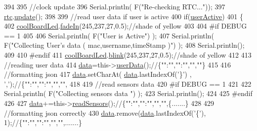 \begin{DoxyCode}
394 
395     \textcolor{comment}{//clock update}
396     Serial.println( F(\textcolor{stringliteral}{"Re-checking RTC..."}));
397     \hyperlink{class_cool_board_a50d2a6716879d64a85f3c6b44ad63275}{rtc}.\hyperlink{class_cool_time_aae601f795452cfa48d9fb337aed483a8}{update}();
398 
399     \textcolor{comment}{//read user data if user is active}
400     \textcolor{keywordflow}{if}(\hyperlink{class_cool_board_a6395459131d6889a3005f79c7a35e964}{userActive})
401     \{
402         \hyperlink{class_cool_board_a1b1d3c684a5baa56b08486e192fd8e97}{coolBoardLed}.\hyperlink{class_cool_board_led_ab778f5e7bed0ab74e3906d82110493c3}{fadeIn}(245,237,27,0.5);\textcolor{comment}{//shade of yellow}
403     
404 \textcolor{preprocessor}{    #if DEBUG == 1}
405 
406         Serial.println( F(\textcolor{stringliteral}{"User is Active"}) );
407         Serial.println( F(\textcolor{stringliteral}{"Collecting User's data ( mac,username,timeStamp )"}) );
408         Serial.println();
409     
410 \textcolor{preprocessor}{    #endif  }
411         \hyperlink{class_cool_board_a1b1d3c684a5baa56b08486e192fd8e97}{coolBoardLed}.\hyperlink{class_cool_board_led_a96e1ea13003eee34c9dbcef340404426}{blink}(245,237,27,0.5);\textcolor{comment}{//shade of yellow   }
412 
413         \textcolor{comment}{//reading user data}
414         \hyperlink{class_cool_board_a427fb753dd8575bdf821c70a5c63d695}{data}=this->\hyperlink{class_cool_board_ae7358fb6e623cfc81b775f5f1734909b}{userData}();\textcolor{comment}{//\{"":"","":"","",""\}}
415 
416         \textcolor{comment}{//formatting json }
417         \hyperlink{class_cool_board_a427fb753dd8575bdf821c70a5c63d695}{data}.setCharAt( \hyperlink{class_cool_board_a427fb753dd8575bdf821c70a5c63d695}{data}.lastIndexOf(\textcolor{charliteral}{'\}'}) , \textcolor{charliteral}{','});\textcolor{comment}{//\{"":"","":"","","",}
418                 
419         \textcolor{comment}{//read sensors data}
420 \textcolor{preprocessor}{    #if DEBUG == 1}
421 
422         Serial.println( F(\textcolor{stringliteral}{"Collecting sensors data "}) );
423         Serial.println();
424     
425 \textcolor{preprocessor}{    #endif}
426 
427         \hyperlink{class_cool_board_a427fb753dd8575bdf821c70a5c63d695}{data}+=this->\hyperlink{class_cool_board_ad03abdce2e65f520bbf2cff0f2d083cf}{readSensors}();\textcolor{comment}{//\{"":"","":"","","",\{.......\}     }
428 
429         \textcolor{comment}{//formatting json correctly}
430         \hyperlink{class_cool_board_a427fb753dd8575bdf821c70a5c63d695}{data}.remove(\hyperlink{class_cool_board_a427fb753dd8575bdf821c70a5c63d695}{data}.lastIndexOf(\textcolor{charliteral}{'\{'}), 1);\textcolor{comment}{//\{"":"","":"","","",.......\}}

\end{DoxyCode}
